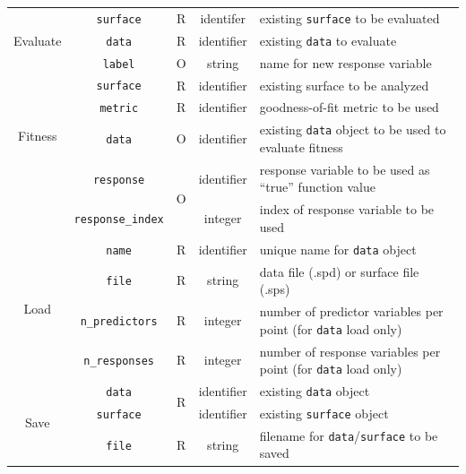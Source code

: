 \documentclass{article}
\begin{document}
\begin{table}[h]
\begin{tabular}{|c|c|c|c|p{8cm}|}
    \multirow{3}{*}{Evaluate} & \texttt{surface} & R & identifer & existing \texttt{surface} to be evaluated \\
    \cline{2-5}
    & \texttt{data} & R & identifier & existing \texttt{data} to evaluate \\
    \cline{2-5}
    & \texttt{label} & O & string & name for new response variable \\
    \hline

    \multirow{4}{*}{Fitness} & \texttt{surface} & R & identifier & existing surface to be analyzed \\
    \cline{2-5}
     & \texttt{metric} & R & identifier & goodness-of-fit metric to be used \\
    \cline{2-5}
     & \texttt{data} & O & identifier & existing \texttt{data} object to be used to evaluate fitness \\
    \cline{2-5}
    & \texttt{response} & \multirow{2}{*}{O} & identifier & response variable to be used as ``true'' function value \\
    \cline{2-2} \cline{4-5}
    & \texttt{response\_index} &  & integer & index of response variable to be used \\
    \hline

    \multirow{4}{*}{Load} & \texttt{name} & R & identifier & unique name for \texttt{data} object \\
    \cline{2-5}
    & \texttt{file} & R & string & data file (.spd) or surface file (.sps) \\
    \cline{2-5}
    & \texttt{n\_predictors} & R & integer & number of predictor variables per point (for \texttt{data} load only)\\
    \cline{2-5}
    & \texttt{n\_responses} & R & integer & number of response variables per point (for \texttt{data} load only) \\
    \hline

    \multirow{3}{*}{Save} & \texttt{data} & \multirow{2}{*}{R} & identifier & existing \texttt{data} object \\
    \cline{2-2}
    \cline{4-5}
	 & \texttt{surface} &  & identifier & existing \texttt{surface} object \\ 
    \cline{2-5}
	 & \texttt{file} & R & string & filename for \texttt{data}/\texttt{surface} to be saved \\
    \hline

  \end{tabular}
\end{table}
\end{document}

